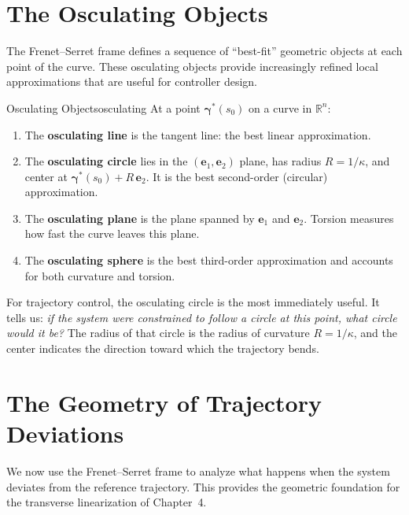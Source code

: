 \documentclass[12pt, openany]{book}
\theoremstyle{plain}
\newcommand{\traj}{\bm{\gamma}}
\newcommand{\Reals}{\mathbb{R}}
\newcommand{\tangent}{\bm{e}_1}
\newcommand{\normal}{\bm{e}_2}
\begin{document}
\section{The Osculating Objects}

The Frenet--Serret frame defines a sequence of ``best-fit'' geometric objects at
each point of the curve. These osculating objects provide increasingly refined
local approximations that are useful for controller design.

\begin{definition}{Osculating Objects}{osculating}
  At a point $\traj^*(s_0)$ on a curve in $\Reals^n$:
  \begin{enumerate}[label=(\roman*)]
    \item The \textbf{osculating line} is the tangent line: the best linear
      approximation.
    \item The \textbf{osculating circle} lies in the $(\tangent, \normal)$ plane,
      has radius $R = 1/\kappa$, and center at $\traj^*(s_0) + R\,\normal$.
      It is the best second-order (circular) approximation.
    \item The \textbf{osculating plane} is the plane spanned by $\tangent$ and
      $\normal$. Torsion measures how fast the curve leaves this plane.
    \item The \textbf{osculating sphere} is the best third-order approximation
      and accounts for both curvature and torsion.
  \end{enumerate}
\end{definition}

For trajectory control, the osculating circle is the most immediately useful.
It tells us: \emph{if the system were constrained to follow a circle at this
point, what circle would it be?} The radius of that circle is the radius of
curvature $R = 1/\kappa$, and the center indicates the direction toward which
the trajectory bends.

\section{The Geometry of Trajectory Deviations}

We now use the Frenet--Serret frame to analyze what happens when the system
deviates from the reference trajectory. This provides the geometric foundation
for the transverse linearization of Chapter~4.
\end{document}
